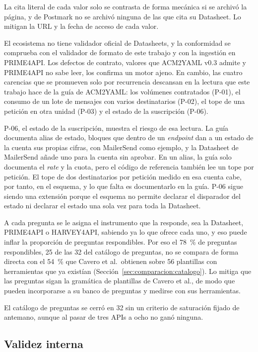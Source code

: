 La cita literal de cada valor solo se contrasta de forma mecánica si se archivó la página, y de Postmark no se archivó ninguna de las que cita su Datasheet.
Lo mitigan la URL y la fecha de acceso de cada valor.

El ecosistema no tiene validador oficial de Datasheets, y la conformidad se comprueba con el validador de formato de este trabajo y con la ingestión en PRIME4API.
Los defectos de contrato, valores que ACM2YAML v0.3 admite y PRIME4API no sabe leer, los confirma un motor ajeno.
En cambio, las cuatro carencias que se promueven solo por recurrencia descansan en la lectura que este trabajo hace de la guía de ACM2YAML: los volúmenes contratados (P-01), el consumo de un lote de mensajes con varios destinatarios (P-02), el tope de una petición en otra unidad (P-03) y el estado de la suscripción (P-06).

P-06, el estado de la suscripción, muestra el riesgo de esa lectura.
La guía documenta alias de estado, bloques que dentro de un \textit{endpoint} dan a un estado de la cuenta sus propias cifras, con MailerSend como ejemplo, y la Datasheet de MailerSend añade uno para la cuenta sin aprobar.
En un alias, la guía solo documenta el \textit{rate} y la cuota, pero el código de referencia también lee un tope por petición.
El tope de dos destinatarios por petición medido en esa cuenta cabe, por tanto, en el esquema, y lo que falta es documentarlo en la guía.
P-06 sigue siendo una extensión porque el esquema no permite declarar el disparador del estado ni declarar el estado una sola vez para toda la Datasheet.

A cada pregunta se le asigna el instrumento que la responde, sea la Datasheet, PRIME4API o HARVEY4API, sabiendo ya lo que ofrece cada uno, y eso puede inflar la proporción de preguntas respondibles.
Por eso el 78~\% de preguntas respondibles, 25 de las 32 del catálogo de preguntas, no se compara de forma directa con el 54~\% que Cavero et al.\ obtienen sobre 56 plantillas con herramientas que ya existían \citep{cavero2026pricingintelligence} (Sección~\ref{sec:comparacion:catalogo}).
Lo mitiga que las preguntas sigan la gramática de plantillas de Cavero et al., de modo que pueden incorporarse a su banco de preguntas y medirse con sus herramientas.

El catálogo de preguntas se cerró en 32 sin un criterio de saturación fijado de antemano, aunque al pasar de tres APIs a ocho no ganó ninguna.

\subsection{Validez interna}\label{sec:conclusiones:interna}

